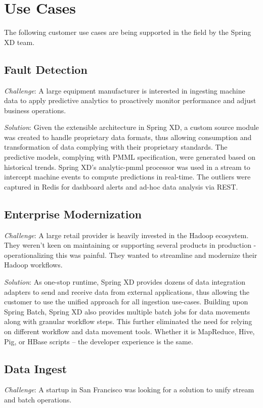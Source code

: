 \section{Use Cases}
\label{sec:Use Cases}

The following customer use cases are being supported in the field by the
Spring XD team.

\subsection{Fault Detection}
\textit{Challenge}: A large equipment manufacturer is interested in
ingesting machine data to apply predictive analytics to proactively monitor
performance and adjust business operations.

\textit{Solution}: Given the extensible architecture in Spring XD, a custom
source module was created to handle proprietary data formats, thus allowing
consumption and transformation of data complying with their proprietary
standards. The predictive models, complying with PMML specification, were
generated based on historical trends. Spring XD's analytic-pmml processor was
used in a stream to intercept machine events to compute predictions in
real-time. The outliers were captured in Redis for dashboard alerts 
and ad-hoc data analysis via REST.

\subsection{Enterprise Modernization}
\textit{Challenge}: A large retail provider is heavily invested in the Hadoop
ecosystem. They weren't keen on maintaining or supporting several products in
production - operationalizing this was painful. They wanted to streamline and
modernize their Hadoop workflows.

\textit{Solution}: As one-stop runtime, Spring XD provides dozens of data
integration adapters to send and receive data from external applications, thus
allowing the customer to use the unified approach for all ingestion use-cases.
Building upon Spring Batch, Spring XD also provides multiple batch jobs for data
movements along with granular workflow steps. This further eliminated the need
for relying on different workflow and data movement tools. Whether it is 
MapReduce, Hive, Pig, or HBase scripts -- the developer experience is the same.

\subsection{Data Ingest}
\textit{Challenge}: A startup in San Francisco was looking for a solution to
unify stream and batch operations. 


